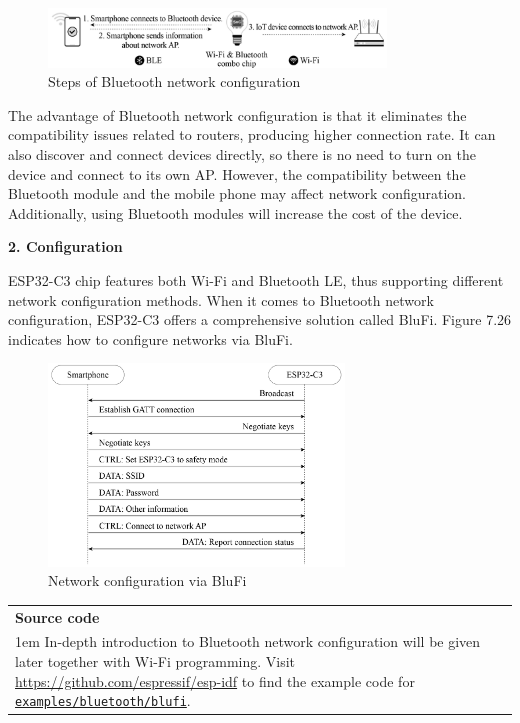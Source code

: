 \documentclass[a4paper,12pt,openany]{book}
\newcommand{\note}[2][NOTE]{ %
\vspace{6pt}
\begin{tabular}{b{\textwidth}}
\hline
\fontfamily{phv}\selectfont \textbf{#1}\\
\leftskip 1em #2\\
\hline
\end{tabular}
}
\begin{document}
\begin{figure}[!h]
    \centering
    \includegraphics[width=0.8\textwidth]{D7Z/7-25}
    \caption{Steps of Bluetooth network configuration}
\end{figure}

The advantage of Bluetooth network configuration is that it eliminates the compatibility issues related to routers, producing higher connection rate. It can also discover and connect devices directly, so there is no need to turn on the device and connect to its own AP. However, the compatibility between the Bluetooth module and the mobile phone may affect network configuration. Additionally, using Bluetooth modules will increase the cost of the device.

\textbf{2. Configuration}

ESP32-C3 chip features both Wi-Fi and Bluetooth LE, thus supporting different network configuration methods. When it comes to Bluetooth network configuration, ESP32-C3 offers a comprehensive solution called BluFi. Figure 7.26 indicates how to configure networks via BluFi.

\begin{figure}[!h]
    \centering
    \includegraphics[width=0.7\textwidth]{D7Z/7-26}
    \caption{Network configuration via BluFi}
\end{figure}

\note[Source code]{In-depth introduction to Bluetooth network configuration will be given later together with Wi-Fi programming. Visit \url{https://github.com/espressif/esp-idf} to find the example code for \href{https://github.com/espressif/esp-idf/tree/master/examples/bluetooth/blufi}{\texttt{examples/bluetooth/blufi}}.}
\end{document}
